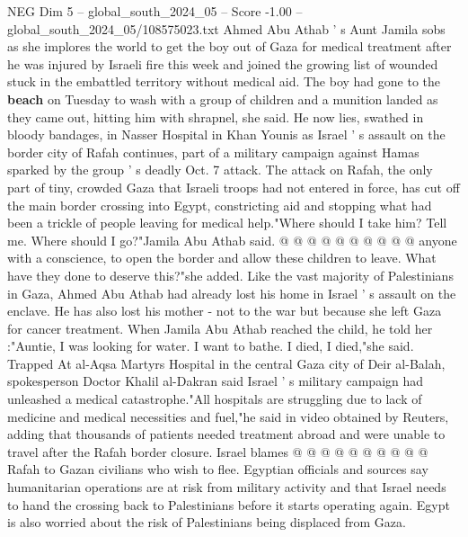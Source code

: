 \begin{textsample}{NEG Dim 5 – global\_south\_2024\_05 – Score -1.00 – global\_south\_2024\_05/108575023.txt}  \label{ex:f5_neg_385}
Ahmed Abu Athab ' s Aunt Jamila sobs as she implores the world to get the boy out of Gaza for medical treatment after he was injured by Israeli fire this week and joined the growing list of wounded stuck in the embattled territory without medical aid.
The boy had gone to the \textbf{beach} on Tuesday to wash with a group of children and a munition landed as they came out, hitting him with shrapnel, she said.
He now lies, swathed in bloody bandages, in Nasser Hospital in Khan Younis as Israel ' s assault on the border city of Rafah continues, part of a military campaign against Hamas sparked by the group ' s deadly Oct. 7 attack.
The attack on Rafah, the only part of tiny, crowded Gaza that Israeli troops had not entered in force, has cut off the main border crossing into Egypt, constricting aid and stopping what had been a trickle of people leaving for medical help."Where should I take him?
Tell me.
Where should I go?"Jamila Abu Athab said. @ @ @ @ @ @ @ @ @ @ anyone with a conscience, to open the border and allow these children to leave.
What have they done to deserve this?"she added.
Like the vast majority of Palestinians in Gaza, Ahmed Abu Athab had already lost his home in Israel ' s assault on the enclave.
He has also lost his mother - not to the war but because she left Gaza for cancer treatment.
When Jamila Abu Athab reached the child, he told her :"Auntie, I was looking for water.
I want to bathe.
I died, I died,"she said.
Trapped At al-Aqsa Martyrs Hospital in the central Gaza city of Deir al-Balah, spokesperson Doctor Khalil al-Dakran said Israel ' s military campaign had unleashed a medical catastrophe."All hospitals are struggling due to lack of medicine and medical necessities and fuel,"he said in video obtained by Reuters, adding that thousands of patients needed treatment abroad and were unable to travel after the Rafah border closure.
Israel blames @ @ @ @ @ @ @ @ @ @ Rafah to Gazan civilians who wish to flee.
Egyptian officials and sources say humanitarian operations are at risk from military activity and that Israel needs to hand the crossing back to Palestinians before it starts operating again.
Egypt is also worried about the risk of Palestinians being displaced from Gaza.

\end{textsample}
